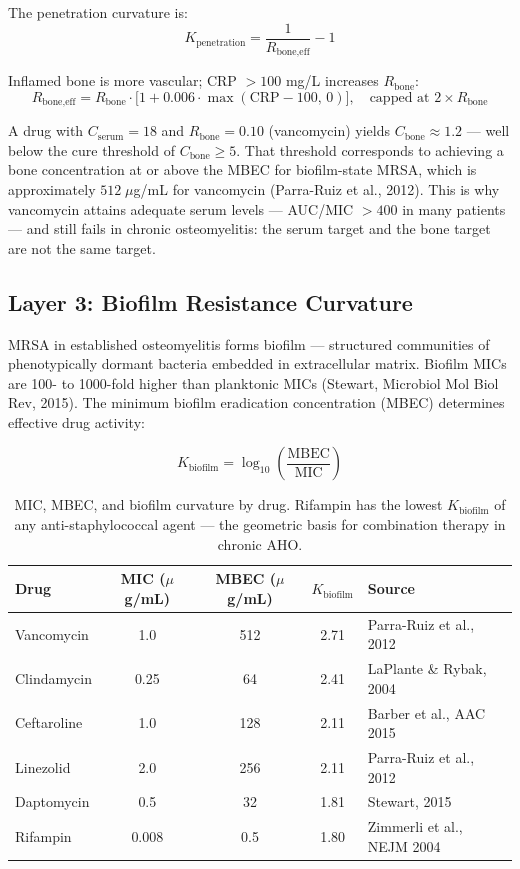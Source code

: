 \documentclass[11pt]{article}
\begin{document}
The penetration curvature is:
\[
  K_{\text{penetration}} = \frac{1}{R_{\text{bone,eff}}} - 1
\]

Inflamed bone is more vascular; CRP $> 100$ mg/L increases $R_{\text{bone}}$:
\[
  R_{\text{bone,eff}} = R_{\text{bone}} \cdot
    \bigl[1 + 0.006 \cdot \max(\text{CRP} - 100,\, 0)\bigr], \quad
    \text{capped at } 2 \times R_{\text{bone}}
\]

A drug with $C_{\text{serum}} = 18$ and $R_{\text{bone}} = 0.10$ (vancomycin)
yields $C_{\text{bone}} \approx 1.2$ — well below the cure threshold of
$C_{\text{bone}} \geq 5$. That threshold corresponds to achieving a bone
concentration at or above the MBEC for biofilm-state MRSA, which is
approximately $512\;\mu$g/mL for vancomycin (Parra-Ruiz et al., 2012).
This is why vancomycin attains adequate serum levels — AUC/MIC $>400$ in
many patients — and still fails in chronic osteomyelitis: the serum target
and the bone target are not the same target.

\subsection{Layer 3: Biofilm Resistance Curvature}

MRSA in established osteomyelitis forms biofilm — structured communities
of phenotypically dormant bacteria embedded in extracellular matrix. Biofilm
MICs are 100- to 1000-fold higher than planktonic MICs (Stewart, Microbiol Mol
Biol Rev, 2015). The minimum biofilm eradication concentration (MBEC) determines
effective drug activity:

\[
  K_{\text{biofilm}} = \log_{10}\!\left(\frac{\text{MBEC}}{\text{MIC}}\right)
\]

\begin{table}[h!]
\centering
\small
\begin{tabular}{lcccl}
\toprule
\textbf{Drug} & \textbf{MIC ($\mu$g/mL)} & \textbf{MBEC ($\mu$g/mL)} & \textbf{$K_{\text{biofilm}}$} & \textbf{Source} \\
\midrule
Vancomycin   & 1.0   & 512  & 2.71 & Parra-Ruiz et al., 2012 \\
Clindamycin  & 0.25  & 64   & 2.41 & LaPlante \& Rybak, 2004 \\
Ceftaroline  & 1.0   & 128  & 2.11 & Barber et al., AAC 2015 \\
Linezolid    & 2.0   & 256  & 2.11 & Parra-Ruiz et al., 2012 \\
Daptomycin   & 0.5   & 32   & 1.81 & Stewart, 2015 \\
Rifampin     & 0.008 & 0.5  & 1.80 & Zimmerli et al., NEJM 2004 \\
\bottomrule
\end{tabular}
\caption{MIC, MBEC, and biofilm curvature by drug. Rifampin has the lowest
$K_{\text{biofilm}}$ of any anti-staphylococcal agent — the geometric basis
for combination therapy in chronic AHO.}
\end{table}
\end{document}
